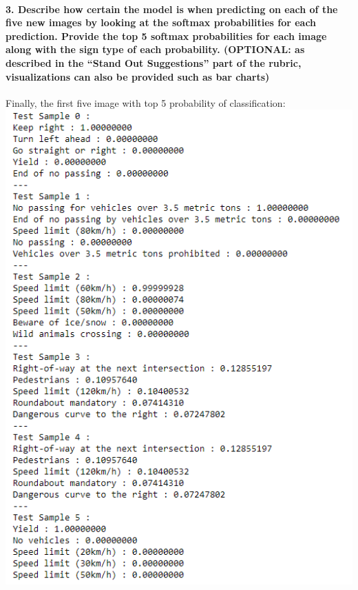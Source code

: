 \documentclass[11pt]{article}
\makeatletter
\def\maxwidth{\ifdim\Gin@nat@width>\linewidth\linewidth
    \else\Gin@nat@width\fi}
\let\Oldincludegraphics\includegraphics
\renewcommand{\includegraphics}[1]{\Oldincludegraphics[width=.8\maxwidth]{#1}}
\makeatother
\begin{document}
\hypertarget{describe-how-certain-the-model-is-when-predicting-on-each-of-the-five-new-images-by-looking-at-the-softmax-probabilities-for-each-prediction.-provide-the-top-5-softmax-probabilities-for-each-image-along-with-the-sign-type-of-each-probability.-optional-as-described-in-the-stand-out-suggestions-part-of-the-rubric-visualizations-can-also-be-provided-such-as-bar-charts}{%
\paragraph{3. Describe how certain the model is when predicting on each
of the five new images by looking at the softmax probabilities for each
prediction. Provide the top 5 softmax probabilities for each image along
with the sign type of each probability. (OPTIONAL: as described in the
``Stand Out Suggestions'' part of the rubric, visualizations can also be
provided such as bar
charts)}\label{describe-how-certain-the-model-is-when-predicting-on-each-of-the-five-new-images-by-looking-at-the-softmax-probabilities-for-each-prediction.-provide-the-top-5-softmax-probabilities-for-each-image-along-with-the-sign-type-of-each-probability.-optional-as-described-in-the-stand-out-suggestions-part-of-the-rubric-visualizations-can-also-be-provided-such-as-bar-charts}}

Finally, the first five image with top 5 probability of classification:
\includegraphics{softmax.PNG}


    
    
    
    
\end{document}
